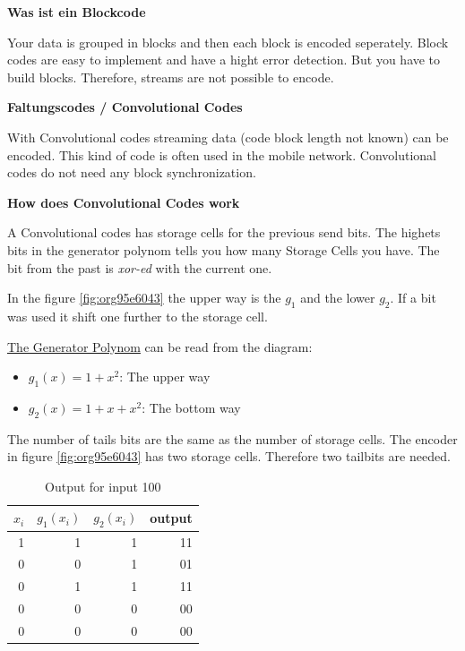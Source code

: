 \documentclass[11pt,twoside,twocolumn,landscape]{article}
\begin{document}
\textbf{Was ist ein Blockcode}

Your data is grouped in blocks and then each block is encoded seperately.
Block codes are easy to implement and have a hight error detection.
But you have to build blocks.
Therefore, streams are not possible to encode.

\textbf{Faltungscodes / Convolutional Codes}

With Convolutional codes streaming data (code block length not known) can be encoded.
This kind of code is often used in the mobile network.
Convolutional codes do not need any block synchronization.

\textbf{How does Convolutional Codes work}

A Convolutional codes has storage cells for the previous send bits.
The highets bits in the generator polynom tells you how many Storage Cells you have.
The bit from the past is \emph{xor-ed} with the current one.

In the figure \ref{fig:org95e6043}  the upper way is the \(g_1\) and the lower \(g_2\).
If a bit was used it shift one further to the storage cell.

\href{../../../roam/20211105145648-the_generator_polynom_for_hamming_codes.org}{The Generator Polynom} can be read from the diagram:
\begin{itemize}
\item \(g_1(x) = 1 + x^2\): The upper way
\item \(g_2(x) = 1 + x + x^2\): The bottom way
\end{itemize}


The number of tails bits are the same as the number of storage cells.
The encoder in figure \ref{fig:org95e6043} has two storage cells.
Therefore two tailbits are needed.


\begin{table}[htbp]
\caption{\label{tab:org3a6b091}Output for input 100}
\centering
\begin{tabular}{rrrr}
\(x_i\) & \(g_1(x_i)\) & \(g_2(x_i)\) & output\\
\hline
1 & 1 & 1 & 11\\
0 & 0 & 1 & 01\\
0 & 1 & 1 & 11\\
0 & 0 & 0 & 00\\
0 & 0 & 0 & 00\\
\end{tabular}
\end{table}
\end{document}
